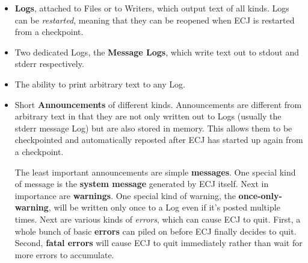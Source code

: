 \documentclass[twoside,10pt]{book}
\newcommand{\mthd}[1]{\item[{\sf #1}]~\newline}
\begin{document}
\begin{itemize}
\item {\bf Logs}, attached to Files or to Writers, which output text of all kinds.  Logs can be {\it restarted}, meaning that they can be reopened when ECJ is restarted from a checkpoint.  
\item Two dedicated Logs, the {\bf Message Logs}, which write text out to stdout and stderr respectively. 
\item The ability to print arbitrary text to any Log.
\item Short {\bf Announcements} of different kinds.  Announcements are different from arbitrary text in that they are not only written out to Logs (usually the stderr message Log) but are also stored in memory.  This allows them to be checkpointed and automatically reposted after ECJ has started up again from a checkpoint.

The least important announcements are simple {\bf messages}.  One special kind of message is the {\bf system message} generated by ECJ itself.  Next in importance are {\bf warnings}.  One special kind of warning, the {\bf once-only-warning}, will be written only once to a Log even if it's posted multiple times.  Next are various kinds of {\it errors}, which can cause ECJ to quit.  First, a whole bunch of basic {\bf errors} can piled on before ECJ finally decides to quit.  Second, {\bf fatal errors} will cause ECJ to quit immediately rather than wait for more errors to accumulate.
\end{itemize}




\end{document}
